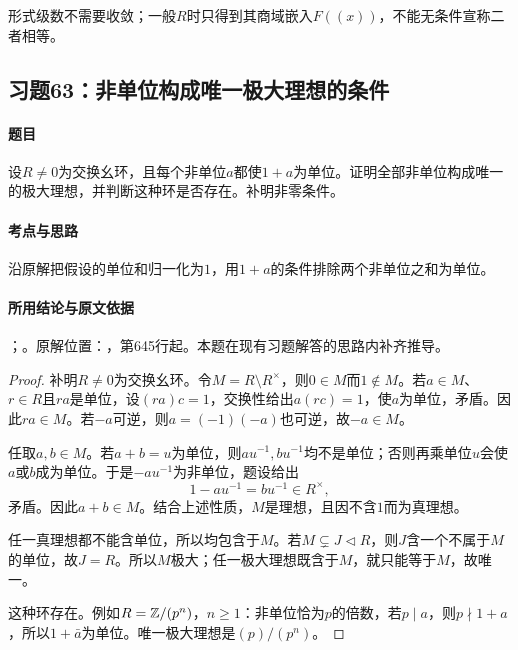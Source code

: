形式级数不需要收敛；一般$R$时只得到其商域嵌入$F((x))$，不能无条件宣称二者相等。



\subsection{习题63：非单位构成唯一极大理想的条件}

\label{ex:3:63}

\paragraph{题目}

设$R\ne0$为交换幺环，且每个非单位$a$都使$1+a$为单位。证明全部非单位构成唯一的极大理想，并判断这种环是否存在。补明非零条件。

\paragraph{考点与思路}

沿原解把假设的单位和归一化为$1$，用$1+a$的条件排除两个非单位之和为单位。

\paragraph{所用结论与原文依据}

；。原解位置：，第645行起。本题在现有习题解答的思路内补齐推导。


\begin{proof}

补明$R\ne0$为交换幺环。令$M=R\setminus R^\times$，则$0\in M$而$1\notin M$。若$a\in M$、$r\in R$且$ra$是单位，设$(ra)c=1$，交换性给出$a(rc)=1$，使$a$为单位，矛盾。因此$ra\in M$。若$-a$可逆，则$a=(-1)(-a)$也可逆，故$-a\in M$。

任取$a,b\in M$。若$a+b=u$为单位，则$au^{-1},bu^{-1}$均不是单位；否则再乘单位$u$会使$a$或$b$成为单位。于是$-au^{-1}$为非单位，题设给出
\[
1-au^{-1}=bu^{-1}\in R^\times,
\]
矛盾。因此$a+b\in M$。结合上述性质，$M$是理想，且因不含$1$而为真理想。

任一真理想都不能含单位，所以均包含于$M$。若$M\subsetneq J\lhd R$，则$J$含一个不属于$M$的单位，故$J=R$。所以$M$极大；任一极大理想既含于$M$，就只能等于$M$，故唯一。

这种环存在。例如$R=\mathbb Z/(p^n)$，$n\ge1$：非单位恰为$p$的倍数，若$p\mid a$，则$p\nmid1+a$，所以$1+\bar a$为单位。唯一极大理想是$(p)/(p^n)$。

\end{proof}

